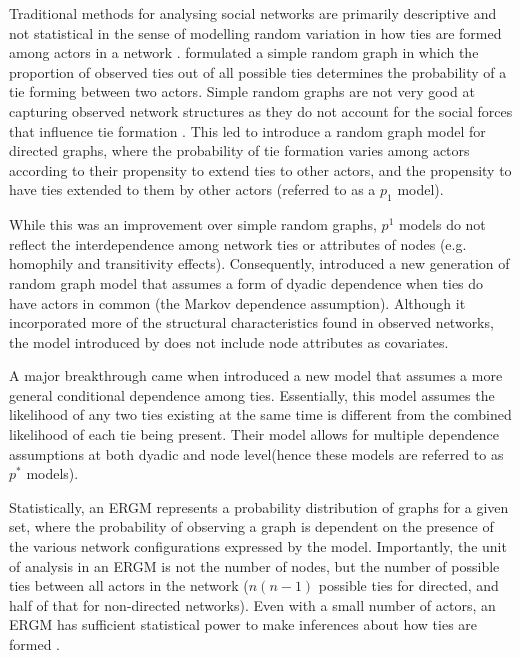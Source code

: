 Traditional methods for analysing social networks are primarily descriptive and not statistical in the sense of modelling random variation in how ties are formed among actors in a network \citep{harris2013introduction}. \citet{erdos1959random} formulated a simple random graph in which the proportion of observed ties out of all possible ties determines the probability of a tie forming between two actors. Simple random graphs are not very good at capturing observed network structures as they do not account for the social forces that influence tie formation \citep{harris2013introduction}. This led \citet{holland1981exponential} to introduce a random graph model for directed graphs, where the probability of tie formation varies among actors according to their propensity to extend ties to other actors, and the propensity to have ties extended to them by other actors (referred to as a $p_1$ model). \medskip

While this was an improvement over simple random graphs, $p^1$ models do not reflect the interdependence among network ties or attributes of nodes (e.g. homophily and transitivity effects). Consequently, \citet{frank1986markov} introduced a new generation of random graph model that assumes a form of dyadic dependence when ties do have actors in common (the Markov dependence assumption). Although it incorporated more of the structural characteristics found in observed networks, the model introduced by \citet{frank1986markov} does not include node attributes as covariates. \medskip

A major breakthrough came when \citet{wasserman1996logit} introduced a new model that assumes a more general conditional dependence among ties. Essentially, this model assumes the likelihood of any two ties existing at the same time is different from the combined likelihood of each tie being present. Their model allows for multiple dependence assumptions at both dyadic and node level(hence these models are referred to as $p^*$ models). \medskip

Statistically, an ERGM represents a probability distribution of graphs for a given set, where the probability of observing a graph is dependent on the presence of the various network configurations expressed by the model. Importantly, the unit of analysis in an ERGM is not the number of nodes, but the number of possible ties between all actors in the network ($n(n-1)$ possible ties for directed, and half of that for non-directed networks). Even with a small number of actors, an ERGM has sufficient statistical power to make inferences about how ties are formed \citep{lusher2013exponential}. \medskip

